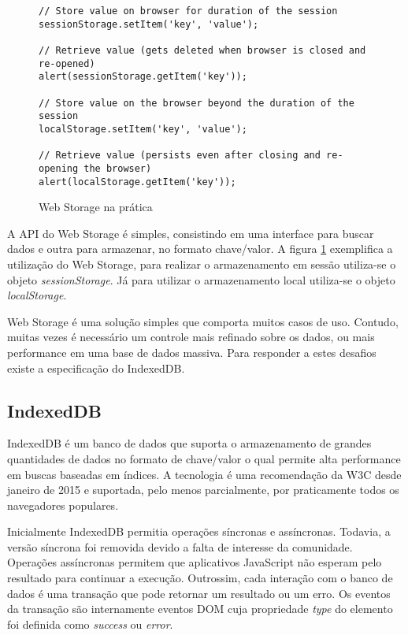 \begin{figure}[H]
\centering
\begin{verbatim}
// Store value on browser for duration of the session
sessionStorage.setItem('key', 'value');

// Retrieve value (gets deleted when browser is closed and re-opened)
alert(sessionStorage.getItem('key'));

// Store value on the browser beyond the duration of the session
localStorage.setItem('key', 'value');

// Retrieve value (persists even after closing and re-opening the browser)
alert(localStorage.getItem('key'));

\end{verbatim}
\caption{Web Storage na prática}
\label{fig:WebStorage}
\end{figure}

A API do Web Storage é simples, consistindo em uma interface
para buscar dados e outra para armazenar, no formato chave/valor.
A figura \ref{fig:WebStorage} exemplifica a utilização do Web
Storage, para realizar o armazenamento em sessão utiliza-se o objeto
\textit{sessionStorage}. Já para utilizar o armazenamento local
utiliza-se o objeto \textit{localStorage}.

Web Storage é uma solução simples que comporta muitos casos de uso.
Contudo, muitas vezes é necessário um controle mais refinado
sobre os dados, ou mais performance em uma base de dados massiva. Para
responder a estes desafios existe a especificação do IndexedDB.

\subsection{IndexedDB}
IndexedDB é um banco de dados que suporta o armazenamento de grandes
quantidades de dados no formato de chave/valor o qual  permite alta
performance em buscas baseadas em índices. A tecnologia é uma recomendação
da W3C desde janeiro de 2015 e suportada, pelo menos parcialmente, por
praticamente todos os navegadores populares.

Inicialmente IndexedDB permitia operações síncronas e assíncronas.
Todavia, a versão síncrona foi removida devido a falta de
interesse da comunidade. Operações assíncronas permitem que
aplicativos JavaScript não esperam pelo resultado para continuar a
execução. Outrossim, cada interação com o banco de dados é uma
transação que pode retornar um resultado ou um erro. Os eventos da
transação são internamente eventos DOM cuja propriedade \textit{type}
do elemento foi definida como \textit{success} ou \textit{error}.

